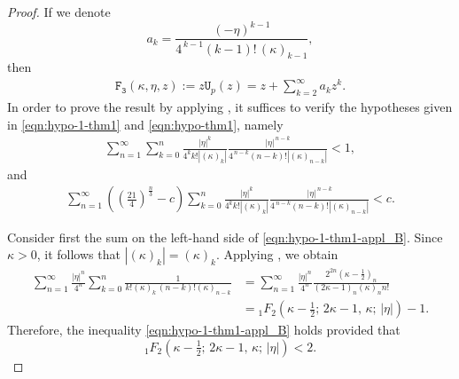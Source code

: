 \documentclass[10pt,a4paper]{amsart}
\begin{document}
\begin{proof}
   If we denote 
\[
   a_k= \frac{(-\eta)^{k-1}}{4^{\,k-1}(k-1)!\, (\kappa)_{k-1}}, 
\]
then 
\begin{align*}
		\mathtt{F_3}(\kappa, \eta, z):= z \mathtt{U}_p(z)= z+\sum_{k=2}^{\infty} a_k z^{k}.
\end{align*}
In order to prove the result by applying , it suffices to verify the hypotheses given in \eqref{eqn:hypo-1-thm1} and \eqref{eqn:hypo-thm1}, namely 
\begin{align}\label{eqn:hypo-1-thm1-appl_B}
\sum_{n=1}^{\infty}  \sum_{k=0}^n  \frac{|\eta|^{k}}{4^k k! |(\kappa)_{k}|}  \frac{|\eta|^{\,n-k}}{4^{\,n-k} (n-k)! |(\kappa)_{n-k}|} < 1,
\end{align}
and 
\begin{align}\label{eqn:hypo-thm1-appl_B}
\sum_{n=1}^{\infty} \left( \left(\tfrac{21}{4}\right)^{\tfrac{n}{3}}- c\right) \sum_{k=0}^n  \frac{|\eta|^{k}}{4^k k! |(\kappa)_{k}|}  \frac{|\eta|^{\,n-k}}{4^{\,n-k} (n-k)! |(\kappa)_{n-k}|} < c.
\end{align}



\noindent
Consider first the sum on the left-hand side of \eqref{eqn:hypo-1-thm1-appl_B}.  
Since $\kappa>0$, it follows that $|(\kappa)_{k}|=(\kappa)_{k}$.  
Applying , we obtain
\begin{align*}
\sum_{n=1}^{\infty} \frac{|\eta|^{n}}{4^n} \sum_{k=0}^n  
 \frac{1}{ k! (\kappa)_{k}\, (n-k)! (\kappa)_{n-k}} 
&=\sum_{n=1}^{\infty} \frac{|\eta|^{n}}{4^n}  
   \frac{ 2^{2n} \left(\kappa-\tfrac{1}{2}\right)_{n}}{\left(2\kappa-1\right)_{n} \left(\kappa\right)_{n} n!}\\
&=  {}_1F_{2}\!\left( \kappa-\tfrac{1}{2};\, 2\kappa-1,\, \kappa;\,  |\eta|\right)-1.
\end{align*}
Therefore, the inequality \eqref{eqn:hypo-1-thm1-appl_B} holds provided that 
\[
 {}_1F_{2}\!\left( \kappa-\tfrac{1}{2};\, 2\kappa-1,\, \kappa;\,  |\eta|\right) < 2.
\]




\end{proof}
\end{document}
